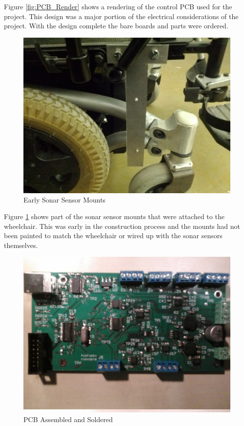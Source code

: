 \documentclass[oneside,final,a4paper]{report}
\begin{document}
Figure \ref{fig:PCB_Render} shows a rendering of the control PCB used for the project. This design was a major portion of the electrical considerations of the project. With the design complete the bare boards and parts were ordered.

\begin{figure}[hbt]
 \centering
 \includegraphics[scale=0.35]{Sensor_Mount}
 \caption{Early Sonar Sensor Mounts}
 \label{fig:sonar_mounts_early}
\end{figure}

Figure \ref{fig:sonar_mounts_early} shows part of the sonar sensor mounts that were attached to the wheelchair. This was early in the construction process and the mounts had not been painted to match the wheelchair or wired up with the sonar sensors themselves.

\begin{figure}[hbt]
 \centering
 \includegraphics[scale=0.35]{solder_complete}
 \caption{PCB Assembled and Soldered}
 \label{fig:PCB_assem}
\end{figure}
\end{document}

